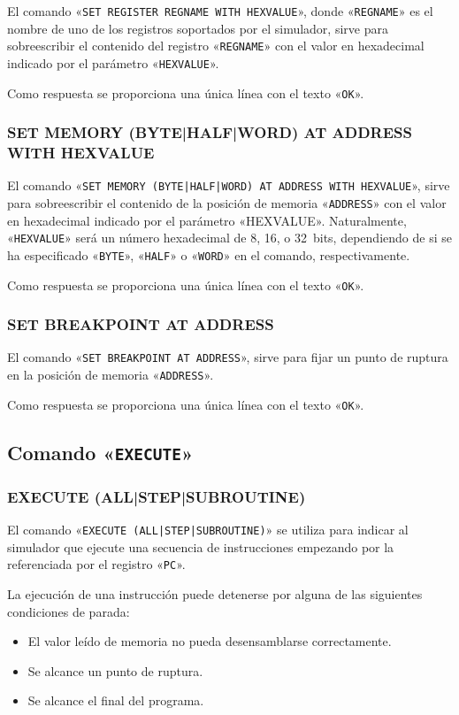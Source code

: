 \documentclass[notitlepage,11pt,a4paper,final,twoside]{article}
\begin{document}
El comando «\texttt{SET REGISTER REGNAME WITH HEXVALUE}», donde
«\texttt{REGNAME}» es el nombre de uno de los registros soportados por
el simulador, sirve para sobreescribir el contenido del registro
«\texttt{REGNAME}» con el valor en hexadecimal indicado por el
parámetro «\texttt{HEXVALUE}».

Como respuesta se proporciona una única línea con el texto
«\texttt{OK}».

\subsubsection{SET MEMORY (BYTE|HALF|WORD) AT ADDRESS WITH HEXVALUE}

El comando «\texttt{SET MEMORY (BYTE|HALF|WORD) AT ADDRESS WITH
  HEXVALUE}», sirve para sobreescribir el contenido de la posición de
memoria «\texttt{ADDRESS}» con el valor en hexadecimal indicado por el
parámetro «HEXVALUE». Naturalmente, «\texttt{HEXVALUE}» será un número
hexadecimal de 8, 16, o 32~bits, dependiendo de si se ha especificado
«\texttt{BYTE}», «\texttt{HALF}» o «\texttt{WORD}» en el comando,
respectivamente.

Como respuesta se proporciona una única línea con el texto
«\texttt{OK}».

\subsubsection{SET BREAKPOINT AT ADDRESS}

El comando «\texttt{SET BREAKPOINT AT ADDRESS}», sirve para fijar un
punto de ruptura en la posición de memoria «\texttt{ADDRESS}».

Como respuesta se proporciona una única línea con el texto
«\texttt{OK}».


\subsection{Comando «\texttt{EXECUTE}»}

\subsubsection{EXECUTE (ALL|STEP|SUBROUTINE)}

El comando «\texttt{EXECUTE (ALL|STEP|SUBROUTINE)}» se utiliza para
indicar al simulador que ejecute una secuencia de instrucciones
empezando por la referenciada por el registro «\texttt{PC}».

La ejecución de una instrucción puede detenerse por alguna de las
siguientes condiciones de parada:
\begin{itemize}
\item El valor leído de memoria no pueda desensamblarse correctamente.
\item Se alcance un punto de ruptura.
\item Se alcance el final del programa.
\end{itemize}
\end{document}
